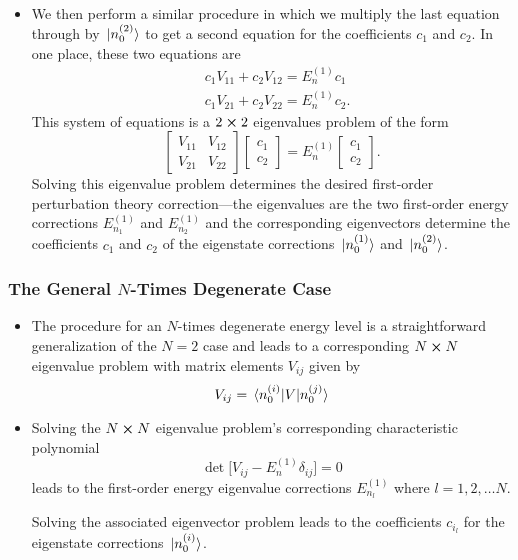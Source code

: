 \documentclass[11pt, a4paper]{article}
\begin{document}
\begin{itemize}
    \item We then perform a similar procedure in which we multiply the last equation through by $ \ket*{n_{0}^{(2)}} $ to get a second equation for the coefficients $ c_{1} $ and $ c_{2} $. In one place, these two equations are
    \begin{align*}
        & c_{1}V_{11} + c_{2}V_{12} = E_{n}^{(1)} c_{1}\\
        & c_{1}V_{21} + c_{2}V_{22} = E_{n}^{(1)} c_{2}.
    \end{align*}
    This system of equations is a $ 2 \cross 2 $ eigenvalues problem of the form
    \begin{equation*}
        \begin{bmatrix}
            V_{11} & V_{12}\\
            V_{21} & V_{22}
        \end{bmatrix}
        \begin{bmatrix}
            c_{1}\\
            c_{2}
        \end{bmatrix}
        = E_{n}^{(1)}
        \begin{bmatrix}
            c_{1}\\
            c_{2}
        \end{bmatrix}.
    \end{equation*}
    Solving this eigenvalue problem determines the desired first-order perturbation theory correction---the eigenvalues are the two first-order energy corrections $ E_{n_{1}}^{(1)} $ and $ E_{n_{2}}^{(1)} $ and the corresponding eigenvectors determine the coefficients $ c_{1} $ and $ c_{2} $ of the eigenstate corrections $ \ket*{n_{0}^{(1)}} $ and $ \ket*{n_{0}^{(2)}} $. 
\end{itemize}

\subsubsection{The General $ N $-Times Degenerate Case}
\begin{itemize}
    \item The procedure for an $ N $-times degenerate energy level is a straightforward generalization of the $ N = 2 $ case and leads to a corresponding $ N \cross N $ eigenvalue problem with matrix elements $ V_{ij} $ given by
    \begin{equation*}
        V_{ij} = \mel*{n_{0}^{(i)}}{V}{n_{0}^{(j)}}
    \end{equation*}

    \item Solving the $ N \cross N $ eigenvalue problem's corresponding characteristic polynomial
    \begin{equation*}
        \det \big[ V_{ij} - E_{n}^{(1)}\delta_{ij} \big] = 0
    \end{equation*}
    leads to the first-order energy eigenvalue corrections $ E_{n_{l}}^{(1)} $ where $ l = 1, 2, \ldots N $. 

    Solving the associated eigenvector problem leads to the coefficients $ c_{i_{l}} $ for the eigenstate corrections $ \ket*{n_{0}^{(i)}} $.
    
    
\end{itemize}
\end{document}

